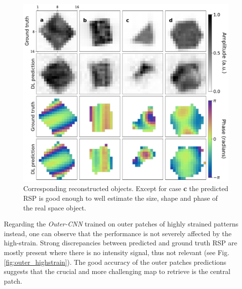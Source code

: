 \begin{figure}[H]
    \centering
    \includegraphics[width=\textwidth]{figures/Phasing/central_patch_highstrain_obj.pdf}
    \caption{Corresponding reconstructed objects. Except for case \textbf{c} the predicted RSP is good enough to well 
    estimate the size, shape and phase of the real space object. }
    \label{fig:central_highstrain_obj}
\end{figure}

Regarding the \textit{Outer-CNN} trained on outer patches of highly strained patterns instead, one can observe that 
the performance is not severely affected by the 
high-strain. Strong discrepancies between predicted and ground truth RSP are mostly present where there is no intensity signal, 
thus not relevant (see Fig.\ref{fig:outer_highstrain}). The good accuracy of the outer patches predictions suggests 
that the crucial and more challenging map to retrieve is the central patch. 


